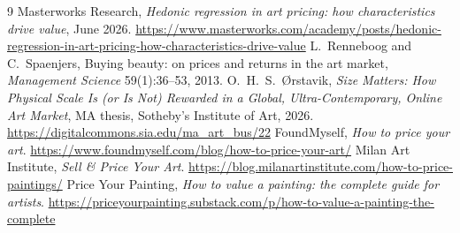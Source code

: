 \documentclass[11pt,a4paper]{article}
\begin{document}
{\raggedright
\begin{thebibliography}{9}
 Masterworks Research, \emph{Hedonic regression in art pricing: how
  characteristics drive value}, June 2026.
  \url{https://www.masterworks.com/academy/posts/hedonic-regression-in-art-pricing-how-characteristics-drive-value}
 L.~Renneboog and C.~Spaenjers, Buying beauty: on prices and returns in the art
  market, \emph{Management Science} 59(1):36--53, 2013.
 O.~H.~S.~{\O}rstavik, \emph{Size Matters: How Physical Scale Is (or Is Not)
  Rewarded in a Global, Ultra-Contemporary, Online Art Market}, MA thesis, Sotheby's Institute of
  Art, 2026. \url{https://digitalcommons.sia.edu/ma_art_bus/22}
 FoundMyself, \emph{How to price your art}.
  \url{https://www.foundmyself.com/blog/how-to-price-your-art/}
 Milan Art Institute, \emph{Sell \& Price Your Art}.
  \url{https://blog.milanartinstitute.com/how-to-price-paintings/}
 Price Your Painting, \emph{How to value a painting: the complete guide
  for artists}. \url{https://priceyourpainting.substack.com/p/how-to-value-a-painting-the-complete}
\end{thebibliography}
}
\end{document}
